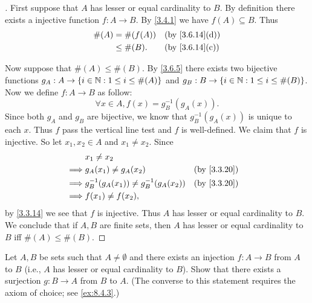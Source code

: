 \begin{proof}[]
	First suppose that \(A\) has lesser or equal cardinality to \(B\).
	By definition there exists a injective function \(f : A \to B\).
	By \cref{3.4.1} we have \(f(A) \subseteq B\).
	Thus
	\begin{align*}
		\#(A) & = \#(f(A))  &  & \by{3.6.14}[d] \\
		      & \leq \#(B). &  & \by{3.6.14}[c]
	\end{align*}

	Now suppose that \(\#(A) \leq \#(B)\).
	By \cref{3.6.5} there exists two bijective functions \(g_A : A \to \left\lbrace i \in \mathbb{N} : 1 \leq i \leq \#(A)\right\rbrace\) and \(g_B : B \to \left\lbrace i \in \mathbb{N} : 1 \leq i \leq \#(B)\right\rbrace\).
	Now we define \(f : A \to B\) as follow:
	\[
		\forall x \in A, f(x) = g_B^{-1}(g_A(x)).
	\]
	Since both \(g_A\) and \(g_B\) are bijective, we know that \(g_B^{-1}(g_A(x))\) is unique to each \(x\).
	Thus \(f\) pass the vertical line test and \(f\) is well-defined.
	We claim that \(f\) is injective.
	So let \(x_1, x_2 \in A\) and \(x_1 \neq x_2\).
	Since
	\begin{align*}
		         & x_1 \neq x_2                                                \\
		\implies & g_A(x_1) \neq g_A(x_2)                     &  & \by{3.3.20} \\
		\implies & g_B^{-1}(g_A(x_1)) \neq g_B^{-1}(g_A(x_2)) &  & \by{3.3.20} \\
		\implies & f(x_1) \neq f(x_2),
	\end{align*}
	by \cref{3.3.14} we see that \(f\) is injective.
	Thus \(A\) has lesser or equal cardinality to \(B\).
	We conclude that if \(A, B\) are finite sets, then \(A\) has lesser or equal cardinality to \(B\) iff \(\#(A) \leq \#(B)\).
\end{proof}

\begin{ex}\label{ex:3.6.8}
	Let \(A, B\) be sets such that \(A \neq \emptyset\) and there exists an injection \(f : A \to B\) from \(A\) to \(B\) (i.e., \(A\) has lesser or equal cardinality to \(B\)).
	Show that there exists a surjection \(g : B \to A\) from \(B\) to \(A\).
	(The converse to this statement requires the axiom of choice;
	see \cref{ex:8.4.3}.)
\end{ex}

